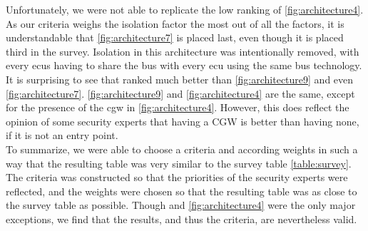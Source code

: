 Unfortunately, we were not able to replicate the low ranking of \ref{fig:architecture4}.
As our criteria weighs the isolation factor the most out of all the factors, it is understandable that \ref{fig:architecture7} is placed last,
even though it is placed third in the survey.
Isolation in this architecture was intentionally removed, with every \gls{ecu}s having to share the bus with every \gls{ecu} using the same bus technology.
It is surprising to see that  ranked much better than \ref{fig:architecture9} and even \ref{fig:architecture7}.
\ref{fig:architecture9} and \ref{fig:architecture4} are the same, except for the presence of the \gls{cgw} in \ref{fig:architecture4}.
However, this does reflect the opinion of some security experts that having a CGW is better than having none, if it is not an entry point.\\

To summarize, we were able to choose a criteria and according weights in such a way that the resulting table was very similar to the survey table \ref{table:survey}.
The criteria was constructed so that the priorities of the security experts were reflected, 
and the weights were chosen so that the resulting table was as close to the survey table as possible.
Though  and \ref{fig:architecture4} were the only major exceptions, 
we find that the results, and thus the criteria, are nevertheless valid.\\